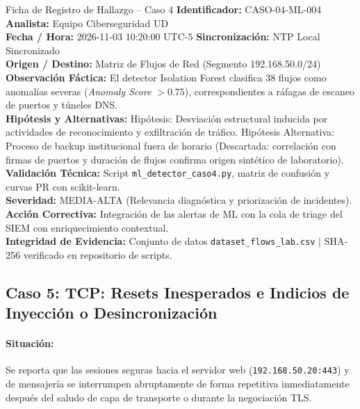 \documentclass[11pt,letterpaper]{article}
\begin{document}
\begin{hallazgobox}{Ficha de Registro de Hallazgo -- Caso 4}
    \textbf{Identificador:} CASO-04-ML-004 \hfill \textbf{Analista:} Equipo Ciberseguridad UD\\
    \textbf{Fecha / Hora:} 2026-11-03 10:20:00 UTC-5 \hfill \textbf{Sincronización:} NTP Local Sincronizado\\
    \textbf{Origen / Destino:} Matriz de Flujos de Red (Segmento 192.168.50.0/24)\\
    \textbf{Observación Fáctica:} El detector Isolation Forest clasifica 38 flujos como anomalías severas (\textit{Anomaly Score} $>0.75$), correspondientes a ráfagas de escaneo de puertos y túneles DNS.\\
    \textbf{Hipótesis y Alternativas:} Hipótesis: Desviación estructural inducida por actividades de reconocimiento y exfiltración de tráfico. Hipótesis Alternativa: Proceso de backup institucional fuera de horario (Descartada: correlación con firmas de puertos y duración de flujos confirma origen sintético de laboratorio).\\
    \textbf{Validación Técnica:} Script \texttt{ml\_detector\_caso4.py}, matriz de confusión y curvas PR con scikit-learn.\\
    \textbf{Severidad:} MEDIA-ALTA (Relevancia diagnóstica y priorización de incidentes).\\
    \textbf{Acción Correctiva:} Integración de las alertas de ML con la cola de triage del SIEM con enriquecimiento contextual.\\
    \textbf{Integridad de Evidencia:} Conjunto de datos \texttt{dataset\_flows\_lab.csv} | SHA-256 verificado en repositorio de scripts.
\end{hallazgobox}

\newpage
\subsection{Caso 5: TCP: Resets Inesperados e Indicios de Inyección o Desincronización}

\paragraph{Situación:} Se reporta que las sesiones seguras hacia el servidor web (\texttt{192.168.50.20:443}) y de mensajería se interrumpen abruptamente de forma repetitiva inmediatamente después del saludo de capa de transporte o durante la negociación TLS.
\end{document}
